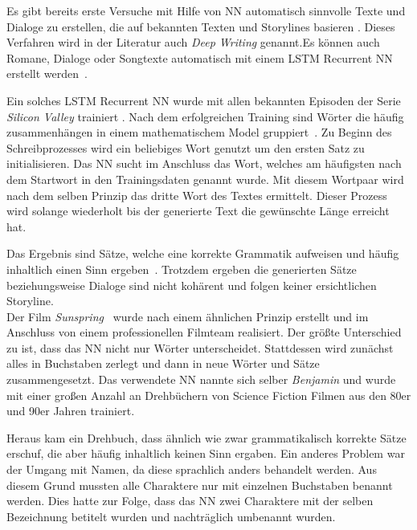 \documentclass[times, 11pt,twocolumn]{article}
\begin{document}
Es gibt bereits erste Versuche mit Hilfe von NN automatisch sinnvolle Texte und Dialoge zu erstellen, die auf bekannten Texten und Storylines basieren \cite{Thoma16}. Dieses Verfahren wird in der Literatur auch \textit{Deep Writing} genannt.Es können auch Romane, Dialoge oder Songtexte automatisch mit einem LSTM Recurrent NN erstellt werden~\cite{DrehbuchWrite}.

 \label{sec:SOTAVorverarbeitung}
Ein solches LSTM Recurrent NN wurde mit allen bekannten Episoden der Serie \textit{Silicon Valley} trainiert \cite{DrehbuchSV}. Nach dem erfolgreichen Training sind Wörter die häufig zusammenhängen in einem mathematischem Model gruppiert~\cite{DrehbuchWrite}. Zu Beginn des Schreibprozesses wird ein beliebiges Wort genutzt um den ersten Satz zu initialisieren. Das NN sucht im Anschluss das Wort, welches am häufigsten nach dem Startwort in den Trainingsdaten genannt wurde. Mit diesem Wortpaar wird nach dem selben Prinzip das dritte Wort des Textes ermittelt. Dieser Prozess wird solange wiederholt bis der generierte Text die gewünschte Länge erreicht hat.

Das Ergebnis sind Sätze, welche eine korrekte Grammatik aufweisen und häufig inhaltlich einen Sinn ergeben~\cite{DrehbuchSV}. Trotzdem ergeben die generierten Sätze beziehungsweise Dialoge sind nicht kohärent und folgen keiner ersichtlichen Storyline. \\

Der Film \textit{Sunspring}~\cite{DrehbuchMovie} wurde nach einem ähnlichen Prinzip erstellt und im Anschluss von einem professionellen Filmteam realisiert. Der größte Unterschied zu \cite{DrehbuchSV} ist, dass das NN nicht nur Wörter unterscheidet. Stattdessen wird zunächst alles in Buchstaben zerlegt und dann in neue Wörter und Sätze zusammengesetzt. Das verwendete NN nannte sich selber \textit{Benjamin} und wurde mit einer großen Anzahl an Drehbüchern von Science Fiction Filmen aus den 80er und 90er Jahren trainiert. 

Heraus kam ein Drehbuch, dass ähnlich wie \cite{DrehbuchSV} zwar grammatikalisch korrekte Sätze erschuf, die aber häufig inhaltlich keinen Sinn ergaben. Ein anderes Problem war der Umgang mit Namen, da diese sprachlich anders behandelt werden. Aus diesem Grund mussten alle Charaktere nur mit einzelnen Buchstaben benannt werden. Dies hatte zur Folge, dass das NN zwei Charaktere mit der selben Bezeichnung betitelt wurden und nachträglich umbenannt wurden.\\
\end{document}
